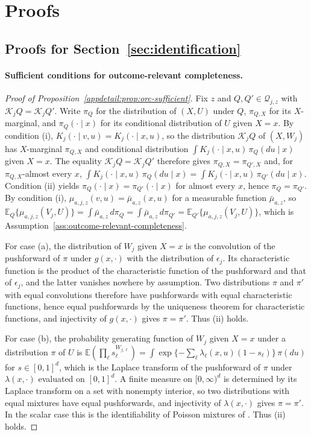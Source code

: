 \section{Proofs}
\label{app:proofs}

\subsection{Proofs for Section~\ref{sec:identification}}

\paragraph{Sufficient conditions for outcome-relevant completeness.}
\begin{proof}[Proof of Proposition~\ref{appdetail:prop:orc-sufficient}]
Fix $z$ and $Q,Q'\in\mathcal Q_{j,z}$ with $\mathcal K_jQ=\mathcal K_jQ'$. Write $\pi_Q$ for the distribution of $(X,U)$ under $Q$, $\pi_{Q,X}$ for its $X$-marginal, and $\pi_Q(\cdot\mid x)$ for its conditional distribution of $U$ given $X=x$. By condition (i), $K_j(\cdot\mid v,u)=K_j(\cdot\mid x,u)$, so the distribution $\mathcal K_jQ$ of $(X,W_j)$ has $X$-marginal $\pi_{Q,X}$ and conditional distribution $\int K_j(\cdot\mid x,u)\,\pi_Q(du\mid x)$ given $X=x$. The equality $\mathcal K_jQ=\mathcal K_jQ'$ therefore gives $\pi_{Q,X}=\pi_{Q',X}$ and, for $\pi_{Q,X}$-almost every $x$, $\int K_j(\cdot\mid x,u)\,\pi_Q(du\mid x)=\int K_j(\cdot\mid x,u)\,\pi_{Q'}(du\mid x)$. Condition (ii) yields $\pi_Q(\cdot\mid x)=\pi_{Q'}(\cdot\mid x)$ for almost every $x$, hence $\pi_Q=\pi_{Q'}$. By condition (i), $\mu_{a,j,z}(v,u)=\bar\mu_{a,z}(x,u)$ for a measurable function $\bar\mu_{a,z}$, so $\mathbb E_Q\{\mu_{a,j,z}(V_j,U)\}=\int\bar\mu_{a,z}\,d\pi_Q=\int\bar\mu_{a,z}\,d\pi_{Q'}=\mathbb E_{Q'}\{\mu_{a,j,z}(V_j,U)\}$, which is Assumption~\ref{ass:outcome-relevant-completeness}.

For case (a), the distribution of $W_j$ given $X=x$ is the convolution of the pushforward of $\pi$ under $g(x,\cdot)$ with the distribution of $\epsilon_j$. Its characteristic function is the product of the characteristic function of the pushforward and that of $\epsilon_j$, and the latter vanishes nowhere by assumption. Two distributions $\pi$ and $\pi'$ with equal convolutions therefore have pushforwards with equal characteristic functions, hence equal pushforwards by the uniqueness theorem for characteristic functions, and injectivity of $g(x,\cdot)$ gives $\pi=\pi'$. Thus (ii) holds.

For case (b), the probability generating function of $W_j$ given $X=x$ under a distribution $\pi$ of $U$ is $\mathbb E(\prod_\ell s_\ell^{W_{j,\ell}})=\int\exp\{-\sum_\ell\lambda_\ell(x,u)(1-s_\ell)\}\,\pi(du)$ for $s\in[0,1]^{d}$, which is the Laplace transform of the pushforward of $\pi$ under $\lambda(x,\cdot)$ evaluated on $[0,1]^{d}$. A finite measure on $[0,\infty)^{d}$ is determined by its Laplace transform on a set with nonempty interior, so two distributions with equal mixtures have equal pushforwards, and injectivity of $\lambda(x,\cdot)$ gives $\pi=\pi'$. In the scalar case this is the identifiability of Poisson mixtures of \citet{teicher1961identifiability}. Thus (ii) holds.


\end{proof}
